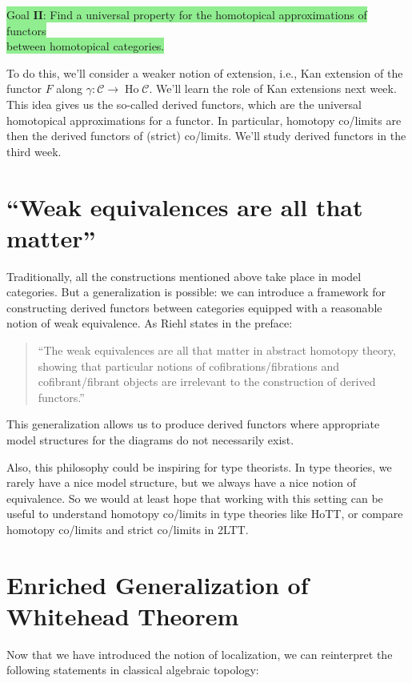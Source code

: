 \documentclass[11pt]{article}
\theoremstyle{definition}
\theoremstyle{remark}
\newcommand{\Ho}{\operatorname{Ho}}
\newcommand{\calC}{\mathcal{C}}
\begin{document}
\bigbreak

\colorbox{lightgreen}{Goal $\mathbf{II}$: Find a universal property for the homotopical approximations of functors}\\
\colorbox{lightgreen}{between homotopical categories.}

\bigbreak

 To do this, we'll consider a weaker notion of extension,
i.e., Kan extension of the functor $F$ along $\gamma: \calC \to \Ho\calC$. 
We'll learn the role of Kan extensions next week. This idea gives us the so-called derived functors, 
which are the universal homotopical approximations for a functor. 
In particular, homotopy co/limits are then the derived functors of (strict) co/limits. 
We'll study derived functors in the third week.

\section{``Weak equivalences are all that matter''}
Traditionally, all the constructions mentioned above take place in model categories.
But a generalization is possible: we can introduce a framework
for constructing derived functors between categories equipped with a reasonable notion of
weak equivalence. As Riehl states  in the preface:

\begin{quote}
``The weak equivalences are all that matter in abstract homotopy theory, showing
that particular notions of cofibrations/fibrations and cofibrant/fibrant objects are irrelevant
to the construction of derived functors.''
\end{quote}

This generalization allows us to produce derived functors where
appropriate model structures for the diagrams do not necessarily exist.

Also, this philosophy could be inspiring for type theorists.
In type theories, we rarely have a nice model structure,
but we always have a nice notion of equivalence.
So we would at least hope that working with this setting can be useful to understand
homotopy co/limits in type theories like HoTT,
or compare homotopy co/limits and strict co/limits in 2LTT.

\section{Enriched  Generalization of Whitehead Theorem}

Now that we have introduced the notion of localization,
we can reinterpret the following statements in classical algebraic topology:
\end{document}
